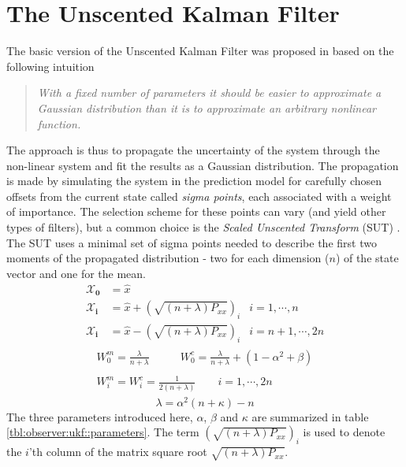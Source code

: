 \section{The Unscented Kalman Filter}
\label{sec:observer:ukf}
    The basic version of the Unscented Kalman Filter was proposed in \citep{Julier95anewapproach}
    based on the following intuition \citep{Julier95anewapproach}
    \begin{quote}\textit{
        With a fixed number of parameters it should be easier to approximate a Gaussian
        distribution than it is to approximate an arbitrary nonlinear function.
        }
    \end{quote}
    The approach is thus to propagate the uncertainty of the system
    through the non-linear system and fit the results as a Gaussian distribution.
    The propagation is made by simulating the system in the prediction
    model for carefully chosen offsets from the current state called
    \textit{sigma points}, each associated with a weight of importance.
    The selection scheme for these points can vary (and yield other
    types of filters), but a common choice
    is the \textit{Scaled Unscented Transform} (SUT) \citep{vandermerwe:upf}.
    The SUT uses a minimal set of sigma points needed to describe the
    first two moments of the propagated distribution - two for each
    dimension ($n$) of the state vector and one for the mean.
    \begin{align}\nonumber
        \mathbf{\mathcal{X}_{0}} &= \hat{x} & \\\nonumber
        \mathbf{\mathcal{X}_{i}} &= \hat{x} + \left( \sqrt{(n + \lambda) P_{xx}} \right)_{i}
            & i = 1,\cdots,n \\
        \mathbf{\mathcal{X}_{i}} &= \hat{x} - \left( \sqrt{(n + \lambda) P_{xx}} \right)_{i}
            & i = n+1,\cdots,2n
    \end{align}
    \begin{align}\nonumber
        \begin{array}{lr}
        W_{0}^{m} = \frac{\lambda}{n + \lambda} \qquad&
            W_{0}^{c} = \frac{\lambda}{n + \lambda} + (1-\alpha^{2} + \beta){}
        \end{array}\\
        \begin{array}{c}
            W^{m}_{i} =  W^{c}_{i} = \frac{1}{2(n + \lambda)} \qquad i = 1,\cdots,2n{}
        \end{array}
    \end{align}
    \begin{equation}
        \lambda = \alpha^{2}(n + \kappa) - n
    \end{equation}
    The three parameters introduced here, $\alpha$, $\beta$ and $\kappa$
    are summarized in table \ref{tbl:observer:ukf::parameters}.
    The term $\left( \sqrt{(n + \lambda) P_{xx}} \right)_{i}$ is used to
    denote the $i$'th column of the matrix square root $\sqrt{(n + \lambda) P_{xx}}$.


